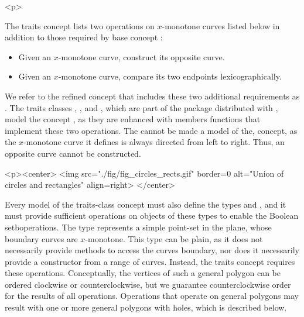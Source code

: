 \begin{ccHtmlOnly}<p>\end{ccHtmlOnly}
The traits concept lists two operations on $x$-monotone curves listed below
in addition to those required by base concept 
:
\begin{itemize}
\item Given an $x$-monotone curve, construct its opposite curve.
\item Given an $x$-monotone curve, compare its two endpoints 
lexicographically.
\end{itemize}
We refer to the refined concept that includes these two additional 
requirements as . The traits 
classes , , 
and , which are part of the  
package distributed with \cgal, model the concept 
, as they are enhanced with members
functions that implement these two operations.
The  cannot be made a model of the, 
 concept, as the
$x$-monotone curve it defines is always directed from left to right. Thus, an
opposite curve cannot be constructed.

\lcHtml{\label{fig:circle_segment}}
\begin{ccHtmlOnly}
  <p><center>
    <img src="./fig/fig_circles_rects.gif" border=0 alt="Union of circles
    and rectangles" align=right>
  </center>
\end{ccHtmlOnly}
Every model of the traits-class concept must also define the types
 and , and it
must provide sufficient operations on objects of these types to enable
the Boolean setboperations.  The type  represents a
simple point-set in the plane, whose boundary curves are $x$-monotone.
This type can be plain, as it does not necessarily provide methods
to access the curves boundary, nor does it necessarily provide a
constructor from a range of curves. Instead, the traits concept
requires these operations. Conceptually, the vertices of such a
general polygon can be ordered clockwise or counterclockwise, but we
guarantee counterclockwise order for the results of all
operations. Operations that operate on general polygons may result
with one or more general polygons with holes, which is described
below.

